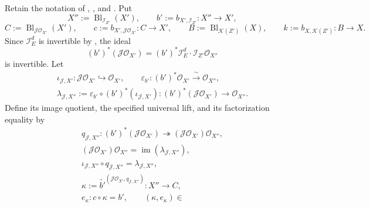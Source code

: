 \begin{definition}
  \label{def:nagata-composition-of-blowups-comparison}

  Retain the notation of
  ,
  , and
  .  Put
  \[
    X'':=\operatorname{Bl}_{\mathcal I_{Z'}}(X'),\qquad
    b':=b_{X',\mathcal I_{Z'}}\colon X''\to X',
  \]
  \[
    C:=\operatorname{Bl}_{\mathcal J\mathcal O_{X'}}(X'),\qquad
    c:=b_{X',\mathcal J\mathcal O_{X'}}\colon C\to X',
    \qquad
    B:=\operatorname{Bl}_{\mathcal K(Z')}(X),\qquad
    k:=b_{X,\mathcal K(Z')}\colon B\to X.
  \]
  Since $\mathcal I_E^d$ is invertible by
  , the ideal
  \[
    (b')^*(\mathcal J\mathcal O_{X'})
      = (b')^*\mathcal I_E^d\cdot
        \mathcal I_{Z'}\mathcal O_{X''}
  \]
  is invertible.  Let
  \[
  \begin{gathered}
    \iota_{\mathcal J,X'}\colon
      \mathcal J\mathcal O_{X'}\hookrightarrow\mathcal O_{X'},\qquad
    \varepsilon_{b'}\colon(b')^*\mathcal O_{X'}
      \xrightarrow{\ \sim\ }\mathcal O_{X''},\\
    \lambda_{\mathcal J,X''}:=
      \varepsilon_{b'}\circ(b')^*(\iota_{\mathcal J,X'})
      \colon(b')^*(\mathcal J\mathcal O_{X'})
        \longrightarrow\mathcal O_{X''}.
  \end{gathered}                                               \tag{CBa}
  \]
  Define its image quotient, the specified universal lift,
  and its factorization equality by
  \[
  \begin{gathered}
    q_{\mathcal J,X''}\colon
      (b')^*(\mathcal J\mathcal O_{X'})
        \twoheadrightarrow
        (\mathcal J\mathcal O_{X'})\mathcal O_{X''},\\
    (\mathcal J\mathcal O_{X'})\mathcal O_{X''}
      =\operatorname{im}(\lambda_{\mathcal J,X''}),\\
    \iota_{\mathcal J,X''}\circ q_{\mathcal J,X''}
      =\lambda_{\mathcal J,X''},\\
    \kappa:=
      \widetilde{b'}^{
        (\mathcal J\mathcal O_{X'},q_{\mathcal J,X''})}
      \colon X''\longrightarrow C,\\
    e_\kappa\colon c\circ\kappa=b',\qquad
    (\kappa,e_\kappa)\in

\end{gathered}\]
\end{definition}
